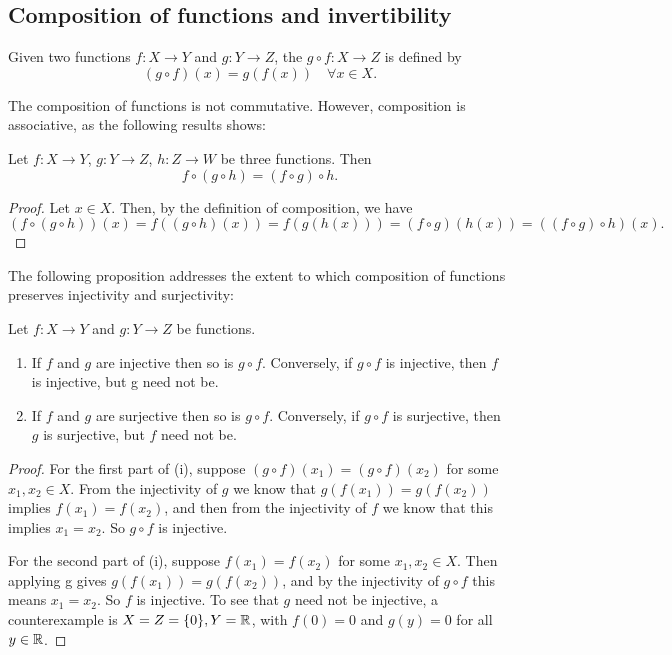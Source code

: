 \subsection{Composition of functions and invertibility}
\begin{definition}
Given two functions $f:X\to Y$ and $g:Y\to Z$, the  $g\circ f:X\to Z$ is defined by
\[ (g \circ f)(x) = g(f(x)) \quad \forall x \in X. \]
\end{definition}

The composition of functions is not commutative. However, composition is associative, as the following results shows:

\begin{proposition}[Associativity]
Let $f:X\to Y$, $g:Y\to Z$, $h:Z\to W$ be three functions. Then
\[ f \circ (g \circ h) = (f \circ g) \circ h. \]
\end{proposition}

\begin{proof}
Let $x \in X$. Then, by the definition of composition, we have
\[ (f \circ (g \circ h))(x) = f((g \circ h)(x)) = f(g(h(x))) = (f \circ g)(h(x)) = ((f \circ g) \circ h)(x). \]
\end{proof}

The following proposition addresses the extent to which composition of functions preserves injectivity and surjectivity:
\begin{proposition}
Let $f:X\to Y$ and $g:Y\to Z$ be functions.
\begin{enumerate}[label=(\roman*)]
\item If $f$ and $g$ are injective then so is $g \circ f$. Conversely, if $g \circ f$ is injective, then $f$ is injective, but g need not be.
\item If $f$ and $g$ are surjective then so is $g \circ f$. Conversely, if $g \circ f$ is surjective, then $g$ is surjective, but $f$ need not be.
\end{enumerate}
\end{proposition}
\begin{proof}
For the first part of (i), suppose $(g \circ f)(x_1) = (g \circ f)(x_2)$ for some $x_1, x_2 \in X$. From the injectivity of $g$ we know that $g(f(x_1)) = g(f(x_2))$ implies $f(x_1) = f(x_2)$, and then from the injectivity of $f$ we know that this implies $x_1 = x_2$. So $g \circ f$ is injective.

For the second part of (i), suppose $f(x_1) = f(x_2)$ for some $x_1, x_2 \in X$. Then applying g gives $g(f(x_1)) = g(f(x_2))$, and by the injectivity of $g \circ f$ this means $x_1 = x_2$. So $f$ is injective. To see that $g$ need not be injective, a counterexample is $X = Z = \{0\}, Y = \mathbb R$, with $f(0) = 0$ and $g(y) = 0$ for all $y \in \mathbb R$.
\end{proof}

